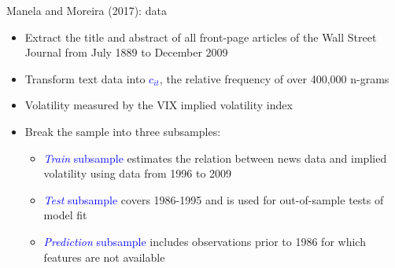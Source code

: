 \documentclass[english]{beamer}
\begin{document}
\begin{frame}{Manela and Moreira (2017): data}
\begin{itemize}
\setlength{\itemsep}{1.3em}
\item Extract the title and abstract of all front-page articles of the Wall Street Journal from July 1889 to December 2009
\item Transform text data into \textcolor{blue}{$c_{it}$}, the relative frequency of over 400,000 n-grams

\item Volatility measured by the VIX implied volatility index
\item Break the sample into three subsamples:
\vspace{3pt}
\begin{itemize}
\setlength{\itemsep}{0.3em}
    \item \textcolor{blue}{\textit{Train} subsample} estimates the relation between news data and implied volatility using data from 1996 to 2009
    \item \textcolor{blue}{\textit{Test} subsample} covers 1986-1995 and is used for out-of-sample tests of model fit
    \item \textcolor{blue}{\textit{Prediction} subsample} includes observations prior to 1986 for which features are not available
\end{itemize}
\end{itemize}
\end{frame}%
\end{document}
